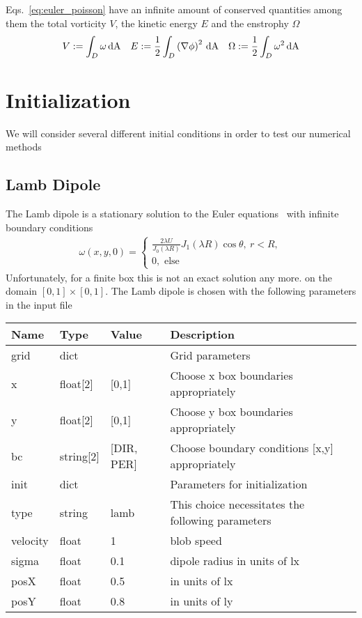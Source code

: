 Eqs.~\eqref{eq:euler_poisson} have an infinite amount of conserved quantities
among them the total vorticity $V$, the kinetic energy $E$ and the enstrophy $\Omega$
 \begin{align}
     V := \int_D \omega \,\mathrm{dA}\quad
     E :=\frac{1}{2} \int_D \left( \nabla \phi\right)^2 \,\mathrm{dA} \quad
     \Omega:= \frac{1}{2} \int_D \omega^2 \,\mathrm{dA}
 \end{align}


\section{Initialization}
We will consider several different initial conditions in order to test
our numerical methods
\subsection{Lamb Dipole}
The Lamb dipole is a stationary solution to the Euler equations~\cite{Nielsen1997} with infinite
boundary conditions
\begin{align}
    \omega(x,y,0) = \begin{cases}
        \frac{2\lambda U}{J_0(\lambda R)} J_1(\lambda R) \cos \theta,\ r < R,\\
        0, \text{ else}
    \end{cases}
\end{align}
Unfortunately, for a finite box this is not an exact solution any more.
on the domain $[0,1]\times [0,1]$.
The Lamb dipole is chosen with the following parameters in the input file
\begin{longtable}{llll}
\toprule
\rowcolor{gray!50}\textbf{Name} &  \textbf{Type} & \textbf{Value}  & \textbf{Description}  \\ \midrule
grid & dict &  & Grid parameters \\
\qquad x & float[2]& [0,1] & Choose x box boundaries appropriately \\
\qquad y & float[2]& [0,1] & Choose y box boundaries appropriately \\
\qquad bc & string[2] & [DIR, PER] & Choose boundary conditions [x,y] appropriately \\
init &  dict &   & Parameters for initialization \\
\qquad type      & string & lamb & This choice necessitates the following parameters \\
\qquad velocity  & float &  1    &  blob speed \\
\qquad sigma     & float &  0.1  & dipole radius in units of lx \\
\qquad posX      & float &  0.5  & in units of lx \\
\qquad posY      & float &  0.8  & in units of ly \\
\bottomrule
\end{longtable}
